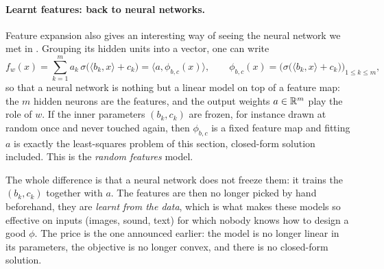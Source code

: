 \paragraph{Learnt features: back to neural networks.}
Feature expansion also gives an interesting way of seeing the neural network we met in
. Grouping its hidden units into a vector, one can write
\[
f_w(x) = \sum_{k=1}^m a_k \, \sigma\big( \langle b_k, x \rangle + c_k \big)
= \big\langle a, \phi_{b,c}(x) \big\rangle ,
\qquad
\phi_{b,c}(x) = \Big( \sigma\big( \langle b_k, x \rangle + c_k \big) \Big)_{1 \leq k \leq m} ,
\]
so that a neural network is nothing but a linear model on top of a feature
map: the $m$ hidden neurons are the features, and the output weights $a \in
\mathbb{R}^m$ play the role of $w$. If the inner parameters $(b_k, c_k)$ are frozen, for
instance drawn at random once and never touched again, then $\phi_{b,c}$ is a
fixed feature map and fitting $a$ is exactly the least-squares problem of this
section, closed-form solution included. This is the \emph{random features}
model.

The whole difference is that a neural network does not freeze them: it trains
the $(b_k, c_k)$ together with $a$. The features are then no longer picked by
hand beforehand, they are \emph{learnt from the data}, which is what makes these
models so effective on inputs (images, sound, text) for which nobody knows how
to design a good $\phi$. The price is the one announced earlier: the model is no
longer linear in its parameters, the objective is no longer convex, and there is
no closed-form solution.